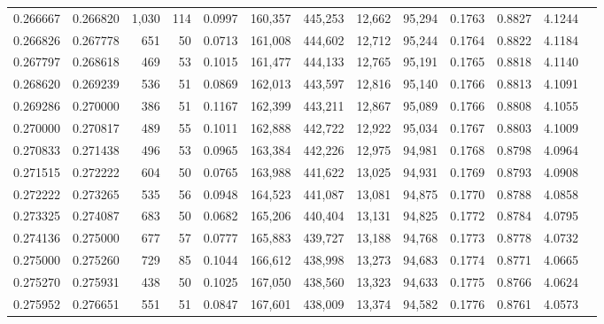 \begin{tabular}{rrrrrrrrrrrrr}
0.266667 & 0.266820 &  1,030 &   114 &                                     0.0997 & 160,357 & 445,253 &  12,662 &  95,294 & 0.1763 & 0.8827 & 4.1244 \\
0.266826 & 0.267778 &    651 &    50 &                                     0.0713 & 161,008 & 444,602 &  12,712 &  95,244 & 0.1764 & 0.8822 & 4.1184 \\
0.267797 & 0.268618 &    469 &    53 &                                     0.1015 & 161,477 & 444,133 &  12,765 &  95,191 & 0.1765 & 0.8818 & 4.1140 \\
0.268620 & 0.269239 &    536 &    51 &                                     0.0869 & 162,013 & 443,597 &  12,816 &  95,140 & 0.1766 & 0.8813 & 4.1091 \\
0.269286 & 0.270000 &    386 &    51 &                                     0.1167 & 162,399 & 443,211 &  12,867 &  95,089 & 0.1766 & 0.8808 & 4.1055 \\
0.270000 & 0.270817 &    489 &    55 &                                     0.1011 & 162,888 & 442,722 &  12,922 &  95,034 & 0.1767 & 0.8803 & 4.1009 \\
0.270833 & 0.271438 &    496 &    53 &                                     0.0965 & 163,384 & 442,226 &  12,975 &  94,981 & 0.1768 & 0.8798 & 4.0964 \\
0.271515 & 0.272222 &    604 &    50 &                                     0.0765 & 163,988 & 441,622 &  13,025 &  94,931 & 0.1769 & 0.8793 & 4.0908 \\
0.272222 & 0.273265 &    535 &    56 &                                     0.0948 & 164,523 & 441,087 &  13,081 &  94,875 & 0.1770 & 0.8788 & 4.0858 \\
0.273325 & 0.274087 &    683 &    50 &                                     0.0682 & 165,206 & 440,404 &  13,131 &  94,825 & 0.1772 & 0.8784 & 4.0795 \\
0.274136 & 0.275000 &    677 &    57 &                                     0.0777 & 165,883 & 439,727 &  13,188 &  94,768 & 0.1773 & 0.8778 & 4.0732 \\
0.275000 & 0.275260 &    729 &    85 &                                     0.1044 & 166,612 & 438,998 &  13,273 &  94,683 & 0.1774 & 0.8771 & 4.0665 \\
0.275270 & 0.275931 &    438 &    50 &                                     0.1025 & 167,050 & 438,560 &  13,323 &  94,633 & 0.1775 & 0.8766 & 4.0624 \\
0.275952 & 0.276651 &    551 &    51 &                                     0.0847 & 167,601 & 438,009 &  13,374 &  94,582 & 0.1776 & 0.8761 & 4.0573 \\

\end{tabular}
